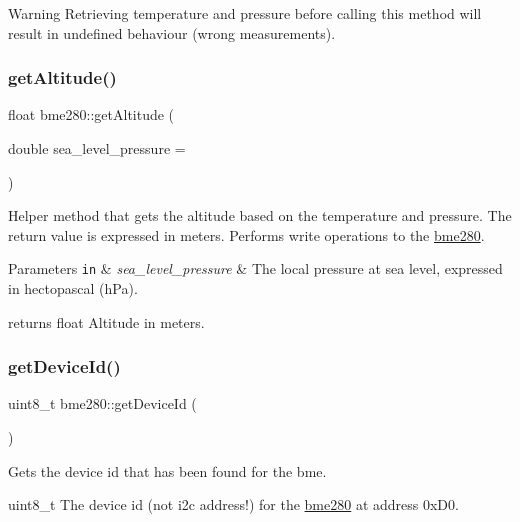 \begin{DoxyWarning}{Warning}
Retrieving temperature and pressure before calling this method will result in undefined behaviour (wrong measurements). 
\end{DoxyWarning}
\mbox{\label{classbme280_ae73c3de91865386f94765e890aa5a5de}} 
\subsubsection{\texorpdfstring{get\+Altitude()}{getAltitude()}}
{\footnotesize\ttfamily float bme280\+::get\+Altitude (\begin{DoxyParamCaption}\item[{double}]{sea\+\_\+level\+\_\+pressure = {} }\end{DoxyParamCaption})}



Helper method that gets the altitude based on the temperature and pressure. The return value is expressed in meters. Performs write operations to the \hyperlink{classbme280}{bme280}. 


\begin{DoxyParams}[1]{Parameters}
\mbox{\tt in}  & {\em sea\+\_\+level\+\_\+pressure} & The local pressure at sea level, expressed in hectopascal (h\+Pa).\\
\hline
\end{DoxyParams}
returns float Altitude in meters. \mbox{\label{classbme280_a486ed59e9eea42e0375628c67e2ed66b}} 
\subsubsection{\texorpdfstring{get\+Device\+Id()}{getDeviceId()}}
{\footnotesize\ttfamily uint8\+\_\+t bme280\+::get\+Device\+Id (\begin{DoxyParamCaption}{ }\end{DoxyParamCaption})}



Gets the device id that has been found for the bme. 

uint8\+\_\+t The device id (not i2c address!) for the \hyperlink{classbme280}{bme280} at address 0x\+D0. \mbox{\label{classbme280_a61798b4e47639700c577e512d990a60a}} 
